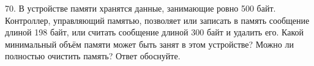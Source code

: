 70. В устройстве памяти хранятся данные, занимающие ровно 500 байт. Контроллер, управляющий памятью, позволяет или записать в память сообщение длиной 198 байт, или считать сообщение длиной 300 байт и удалить его. Какой минимальный объём памяти может быть занят в этом устройстве? Можно ли полностью очистить память? Ответ обоснуйте.\\

